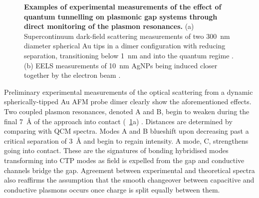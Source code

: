 \documentclass{article}
\begin{document}
\begin{figure}[bt]
\centering
{}
\caption[Examples of experimental measurements of the effect of quantum tunnelling on plasmonic gap systems]{\textbf{Examples of experimental measurements of the effect of quantum tunnelling on plasmonic gap systems through direct monitoring of the plasmon resonances.} (a) Supercontinuum dark-field scattering measurements of two \SI{300}{nm} diameter spherical Au tips in a dimer configuration with reducing separation, transitioning below \SI{1}{nm} and into the quantum regime \cite{savage2012}. (b) EELS measurements of \SI{10}{nm} AgNPs being induced closer together by the electron beam \cite{scholl2013}.}
\label{fig:tunnelling_plasmonics}
\end{figure}

Preliminary experimental measurements of the optical scattering from a dynamic spherically-tipped Au AFM probe dimer clearly show the aforementioned effects. Two coupled plasmon resonances, denoted A and B, begin to weaken during the final \SI{7}{\angstrom} of the approach into contact (\figurename~\ref{fig:tunnelling_plasmonics}a) \cite{savage2012}. Distances are determined by comparing with QCM spectra. Modes A and B blueshift upon decreasing past a critical separation of \SI{3}{\angstrom} and begin to regain intensity. A mode, C, strengthens going into contact. These are the signatures of bonding hybridised modes transforming into CTP modes as field is expelled from the gap and conductive channels bridge the gap. Agreement between experimental and theoretical spectra also reaffirms the assumption that the smooth changeover between capacitive and conductive plasmons occurs once charge is split equally between them.
\end{document}
